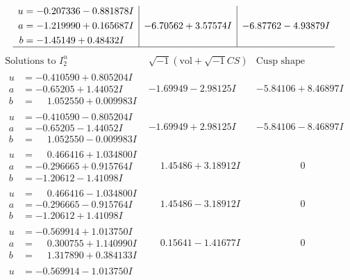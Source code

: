 \documentclass[1p]{elsarticle_modified}
\theoremstyle{definition}
\newcommand{\I}{\sqrt{-1}}
\begin{document}
$$\begin{array}{c|c|c}
\begin{aligned}
u &= -0.207336 - 0.881878 I \\
a &= -1.219990 + 0.165687 I \\
b &= -1.45149 + 0.48432 I\end{aligned}
 & -6.70562 + 3.57574 I & -6.87762 - 4.93879 I\\
 \hline 
 \end{array}$$\newpage$$\begin{array}{c|c|c}  
\text{Solutions to }I^u_{2}& \I (\text{vol} + \sqrt{-1}CS) & \text{Cusp shape}\\
 \hline 
\begin{aligned}
u &= -0.410590 + 0.805204 I \\
a &= -0.65205 + 1.44052 I \\
b &= \phantom{-}1.052550 + 0.009983 I\end{aligned}
 & -1.69949 - 2.98125 I & -5.84106 + 8.46897 I \\ \hline\begin{aligned}
u &= -0.410590 - 0.805204 I \\
a &= -0.65205 - 1.44052 I \\
b &= \phantom{-}1.052550 - 0.009983 I\end{aligned}
 & -1.69949 + 2.98125 I & -5.84106 - 8.46897 I \\ \hline\begin{aligned}
u &= \phantom{-}0.466416 + 1.034800 I \\
a &= -0.296665 + 0.915764 I \\
b &= -1.20612 - 1.41098 I\end{aligned}
 & \phantom{-}1.45486 + 3.18912 I & \phantom{-0.000000 } 0 \\ \hline\begin{aligned}
u &= \phantom{-}0.466416 - 1.034800 I \\
a &= -0.296665 - 0.915764 I \\
b &= -1.20612 + 1.41098 I\end{aligned}
 & \phantom{-}1.45486 - 3.18912 I & \phantom{-0.000000 } 0 \\ \hline\begin{aligned}
u &= -0.569914 + 1.013750 I \\
a &= \phantom{-}0.300755 + 1.140990 I \\
b &= \phantom{-}1.317890 + 0.384133 I\end{aligned}
 & \phantom{-}0.15641 - 1.41677 I & \phantom{-0.000000 } 0 \\ \hline\begin{aligned}
u &= -0.569914 - 1.013750 I \\

\end{aligned}
\end{array}$$
\end{document}
